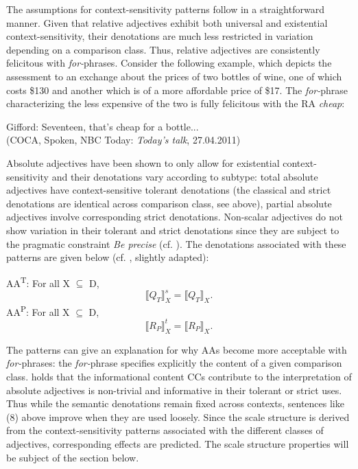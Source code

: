 \documentclass[output=paper
,modfonts
,nonflat]{langsci/langscibook}
\begin{document}
The assumptions for context-sensitivity patterns follow in a straightforward manner. Given that relative adjectives exhibit both universal and existential \linebreak context-sensitivity, their denotations are much less restricted in variation depending on a comparison class. Thus, relative adjectives are consistently felicitous with \textit{for-}phrases. Consider the following example, which depicts the assessment to an exchange about the prices of two bottles of wine, one of which costs \$130 and another which is of a more affordable price of \$17. The  \textit{for-}phrase characterizing the less expensive of the two is fully felicitous with the RA  \textit{cheap}: 

\ea
	Gifford: Seventeen, that's cheap for a bottle... \\ (COCA, Spoken, NBC Today: \textit{Today's talk}, 27.04.2011)
\z
	
Absolute adjectives have been shown to only allow for existential context-sensitivity and their denotations vary according to subtype: total absolute adjectives have context-sensitive tolerant denotations (the classical and strict denotations are identical across comparison class, see above), partial absolute adjectives involve corresponding strict denotations. Non-scalar adjectives do not show variation in their tolerant and strict denotations since they are subject to the pragmatic constraint \textit{Be precise} (cf. \citealt[85]{Burnett2017}). The denotations associated with these patterns are given below (cf. \citealt[85]{Burnett2017}, slightly adapted):

\ea
	AA\textsuperscript{T}: For all X $\subseteq$ D, \[ \llbracket Q_{T} \rrbracket_X^s = \llbracket Q_{T}\rrbracket_{X}\text{.}\]
\z
\ea
	AA\textsuperscript{P}: For all X $\subseteq$ D, \[\llbracket R_{P}\rrbracket_X^t = \llbracket R_{P}\rrbracket_{X}\text{.}\]
\z

The patterns can give an explanation for why AAs become more acceptable with  \textit{for-}phrases: the \textit{for-}phrase specifies explicitly the content of a given comparison class. \textcite[86]{Burnett2017} holds that the informational content CCs contribute to the interpretation of absolute adjectives is non-trivial and informative in their tolerant or strict uses. Thus while the semantic denotations remain fixed across contexts, sentences like (8) above improve when they are used loosely.
Since the scale structure is derived from the context-sensitivity patterns associated with the different classes of adjectives, corresponding effects are predicted. The scale structure properties will be subject of the section below.
\end{document}
